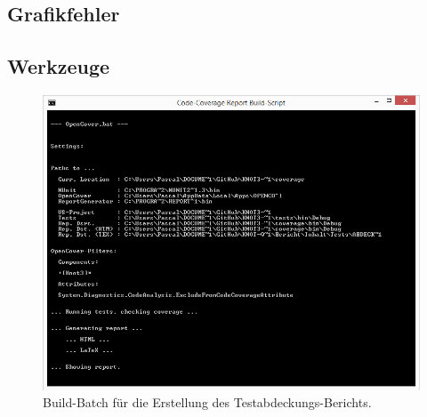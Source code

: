 		~\\
	
	
\clearpage	
% 



\newpage




\subsection*{Grafikfehler}



\newpage



\subsection*{Werkzeuge}



\begin{figure}[ht]

	\centering
	
	\includegraphics[width=\textwidth]{Inhalt/Anhang/Grafiken/Werkzeuge/Code-Coverage Report Build-Script.png}
	
	\caption{Build-Batch für die Erstellung des Testabdeckungs-Berichts.}

\end{figure}








